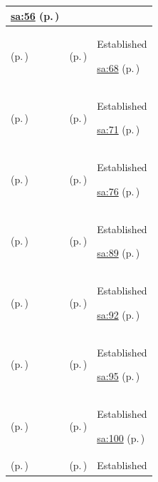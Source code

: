 \begin{longtable}{|>{\raggedright\arraybackslash}p{0.27\TableWidth}|>{\raggedright\arraybackslash}p{0.27\TableWidth}|>{\raggedright\arraybackslash}p{0.46\TableWidth}|}
 \hyperref[rad:sa:48]{sa:56} (p.\,\pageref{rad:sa:48})\\\hline
\nameref{function:establish-encounter-context} (p.\,\pageref{function:establish-encounter-context}) & \nameref{feature:feat-sa-08} (p.\,\pageref{feature:feat-sa-08}) & Established

 \hyperref[rad:sa:63]{sa:68} (p.\,\pageref{rad:sa:63})\\\hline
\nameref{function:progress-encounter-state} (p.\,\pageref{function:progress-encounter-state}) & \nameref{feature:feat-sa-09} (p.\,\pageref{feature:feat-sa-09}) & Established

 \hyperref[rad:sa:63]{sa:71} (p.\,\pageref{rad:sa:63})\\\hline
\nameref{function:maintain-encounter-care-place-association} (p.\,\pageref{function:maintain-encounter-care-place-association}) & \nameref{feature:feat-sa-10} (p.\,\pageref{feature:feat-sa-10}) & Established

 \hyperref[rad:sa:63]{sa:76} (p.\,\pageref{rad:sa:63})\\\hline
\nameref{function:receive-order-request} (p.\,\pageref{function:receive-order-request}) & \nameref{feature:feat-sa-11} (p.\,\pageref{feature:feat-sa-11}) & Established

 \hyperref[rad:sa:83]{sa:89} (p.\,\pageref{rad:sa:83})\\\hline
\nameref{function:resolve-order-destination} (p.\,\pageref{function:resolve-order-destination}) & \nameref{feature:feat-sa-12} (p.\,\pageref{feature:feat-sa-12}) & Established

 \hyperref[rad:sa:83]{sa:92} (p.\,\pageref{rad:sa:83})\\\hline
\nameref{function:manage-order-progression} (p.\,\pageref{function:manage-order-progression}) & \nameref{feature:feat-sa-13} (p.\,\pageref{feature:feat-sa-13}) & Established

 \hyperref[rad:sa:83]{sa:95} (p.\,\pageref{rad:sa:83})\\\hline
\nameref{function:coordinate-order-modification-cancellation} (p.\,\pageref{function:coordinate-order-modification-cancellation}) & \nameref{feature:feat-sa-14} (p.\,\pageref{feature:feat-sa-14}) & Established

 \hyperref[rad:sa:83]{sa:100} (p.\,\pageref{rad:sa:83})\\\hline
\nameref{function:correlate-diagnostic-request} (p.\,\pageref{function:correlate-diagnostic-request}) & \nameref{feature:feat-sa-15} (p.\,\pageref{feature:feat-sa-15}) & Established


\end{longtable}
